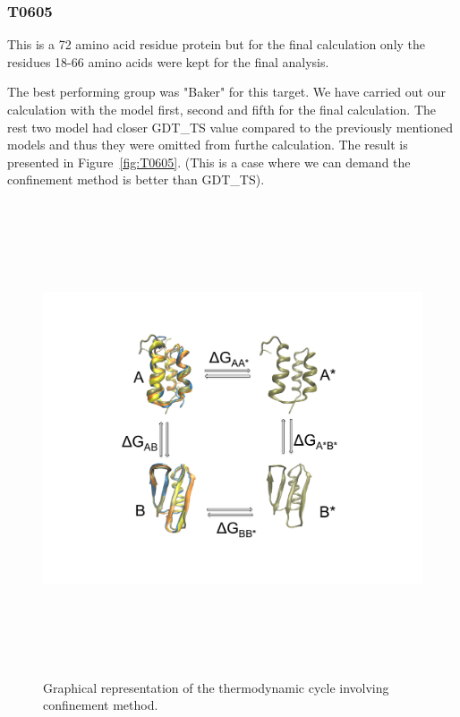 \documentclass[12pt]{article}
\begin{document}
\subsubsection{T0605}

This is a 72 amino acid residue protein but for the final calculation only the residues 18-66 amino acids were kept for the final analysis.

The best performing group was "Baker" for this target. We have carried out our calculation with the model first, second and fifth for the
final calculation. The rest two model had closer GDT\_TS value compared to the previously mentioned models and thus they were omitted from
furthe calculation. The result is presented in Figure~\ref{fig:T0605}. (This is a case where we can demand the confinement
method is better than GDT\_TS).


\begin{figure}
\begin{center}
\includegraphics[width=14cm,height=14cm]{method.pdf}
\end{center}
\caption{Graphical representation of the thermodynamic cycle involving confinement method.}
\label{fig:method}
\end{figure}
\end{document}
